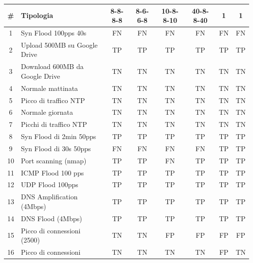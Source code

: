\begin{table}
    \begin{tabularx}{\textwidth}{||c X c c c c c c||} 
        \hline
        \# & Tipologia & 8-8-8-8 & 8-6-6-8 & 10-8-8-10 & 40-8-8-40 & 1& 1\\ [0.5ex] 
        \hline\hline
        1 & Syn Flood 100pps 40s & \cellcolor{magenta} FN & \cellcolor{magenta} FN & \cellcolor{magenta} FN & \cellcolor{magenta} FN & \cellcolor{magenta} FN & \cellcolor{magenta} FN \\ 
        \hline
        2 & Upload 500MB su Google Drive & TP & TP & TP & TP & TP & TP  \\ 
        \hline
        3 &  Download 600MB da Google Drive & TN  & TN & TN & TN & TN & TN \\ 
        \hline 
        4 & Normale mattinata & TN & TN & TN & TN & TN & TN \\
        \hline
        5 & Picco di traffico NTP & TN & TN & TN & TN & TN & TN \\
        \hline
        6 & Normale giornata & TN & TN & TN & TN & TN & TN \\ 
        \hline
        7 & Picchi di traffico NTP & TN & TN & TN & TN & TN & TN  \\ 
        \hline 
        8 & Syn Flood di 2min 50pps & TP & TP & TP & TP & TP & TP \\
        \hline
        9 & Syn Flood di 30s 50pps & \cellcolor{magenta} FN & \cellcolor{magenta} FN & \cellcolor{magenta} FN & \cellcolor{magenta} FN & TP & TP  \\        
        \hline
        10 & Port scanning (nmap) & TP & TP & \cellcolor{magenta} FN & TP & TP & TP   \\
        \hline
        11 & ICMP Flood 100 pps & TP & TP & TP & TP & TP & TP \\
        \hline
        12 & UDP Flood 100pps & TP & TP & TP & TP & TP & TP \\ 
        \hline
        13 & DNS Amplification (4Mbps) & TP & TP & TP & TP & TP & TP \\ 
        \hline 
        14 & DNS Flood (4Mbps) & TP & TP & TP & TP & TP & TP \\
        \hline
        15 & Picco di connessioni (2500) & TN & TN & \cellcolor{orange} FP & \cellcolor{orange} FP & \cellcolor{orange} FP & \cellcolor{orange} FP\\        
        \hline 
        16 & Picco di connessioni & TN & TN & TN & TN & \cellcolor{orange} FP & TN\\        

\end{tabularx}
\end{table}
